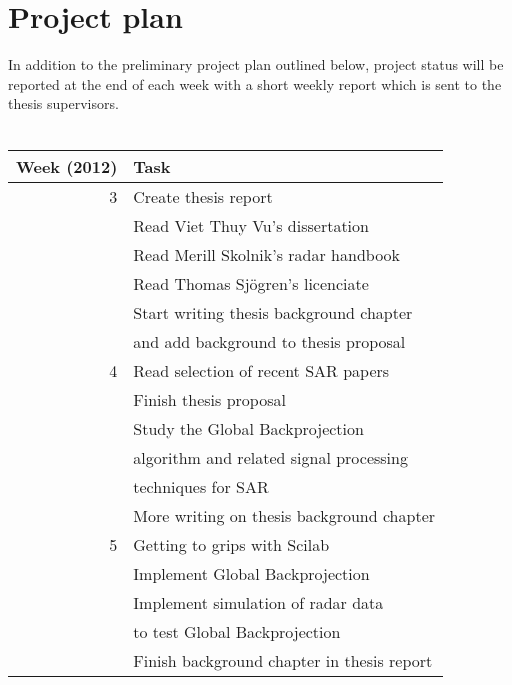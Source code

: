\documentclass{chi2012}
\begin{document}
\section{Project plan}
In addition to the preliminary project plan outlined below, project status will be reported at the end of each week with a short weekly report which is sent to the thesis supervisors.\\\\
\begin{tabular}{rl}

Week (2012) &       Task \\
\toprule
         3 & Create thesis report \\

           & Read Viet Thuy Vu's dissertation \\

           & Read Merill Skolnik's radar handbook \\

           & Read Thomas Sjögren's licenciate \\

           & Start writing thesis background chapter\\& and add background to thesis proposal \\

         4 & Read selection of recent SAR papers \\

           & Finish thesis proposal \\

	& Study the Global Backprojection\\& algorithm and related signal processing\\& techniques for SAR\\

           & More writing on thesis background chapter \\

         5 & Getting to grips with Scilab \\

           & Implement Global Backprojection\\

	& Implement simulation of radar data\\& to test Global Backprojection\\

           & Finish  background chapter in thesis report \\


\end{tabular}
\end{document}
